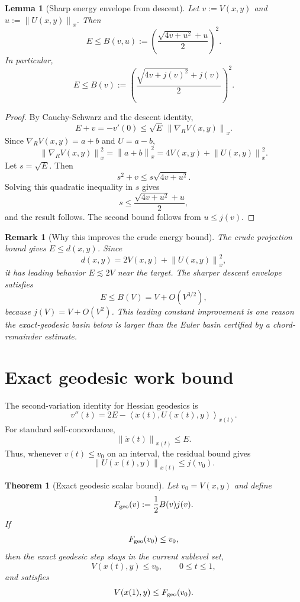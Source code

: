 \documentclass[11pt]{article}
\newtheorem{theorem}{Theorem}
\newtheorem{lemma}{Lemma}
\newtheorem{remark}{Remark}
\newcommand{\ip}[2]{\left\langle #1,#2\right\rangle}
\newcommand{\norm}[1]{\left\lVert #1\right\rVert}
\begin{document}
\begin{lemma}[Sharp energy envelope from descent]
Let $v:=V(x,y)$ and $u:=\norm{U(x,y)}_x$. Then
\[
    E
    \le
    B(v,u)
    :=
    \left(
    \frac{\sqrt{4v+u^2}+u}{2}
    \right)^2.
\]
In particular,
\[
    E\le B(v):=
    \left(
    \frac{\sqrt{4v+j(v)^2}+j(v)}{2}
    \right)^2.
\]
\end{lemma}

\begin{proof}
By Cauchy-Schwarz and the descent identity,
\[
    E+v=-v'(0)
    \le
    \sqrt E\,\norm{\nabla_R V(x,y)}_x.
\]
Since $\nabla_R V(x,y)=a+b$ and $U=a-b$,
\[
    \norm{\nabla_R V(x,y)}_x^2
    =\norm{a+b}_x^2
    =4V(x,y)+\norm{U(x,y)}_x^2.
\]
Let $s=\sqrt E$. Then
\[
    s^2+v\le s\sqrt{4v+u^2}.
\]
Solving this quadratic inequality in $s$ gives
\[
    s\le \frac{\sqrt{4v+u^2}+u}{2},
\]
and the result follows. The second bound follows from $u\le j(v)$.
\end{proof}

\begin{remark}[Why this improves the crude energy bound]
The crude projection bound gives $E\le d(x,y)$. Since
\[
    d(x,y)=2V(x,y)+\norm{U(x,y)}_x^2,
\]
it has leading behavior $E\lesssim 2V$ near the target. The sharper descent envelope satisfies
\[
    E\le B(V)=V+O(V^{3/2}),
\]
because $j(V)=V+O(V^2)$. This leading constant improvement is one reason the exact-geodesic basin below is larger than the Euler basin certified by a chord-remainder estimate.
\end{remark}

\section{Exact geodesic work bound}

The second-variation identity for Hessian geodesics is
\[
    v''(t)=2E-\ip{\ddot x(t)}{U(x(t),y)}_{x(t)}.
\]
For standard self-concordance,
\[
    \norm{\ddot x(t)}_{x(t)}\le E.
\]
Thus, whenever $v(t)\le v_0$ on an interval, the residual bound gives
\[
    \norm{U(x(t),y)}_{x(t)}\le j(v_0).
\]

\begin{theorem}[Exact geodesic scalar bound]
Let $v_0=V(x,y)$ and define
\[
    F_{\rm geo}(v):=\frac12 B(v)j(v).
\]
If
\[
    F_{\rm geo}(v_0)\le v_0,
\]
then the exact geodesic step stays in the current sublevel set,
\[
    V(x(t),y)\le v_0,\qquad 0\le t\le1,
\]
and satisfies
\[
    V(x(1),y)\le F_{\rm geo}(v_0).
\]
\end{theorem}
\end{document}
